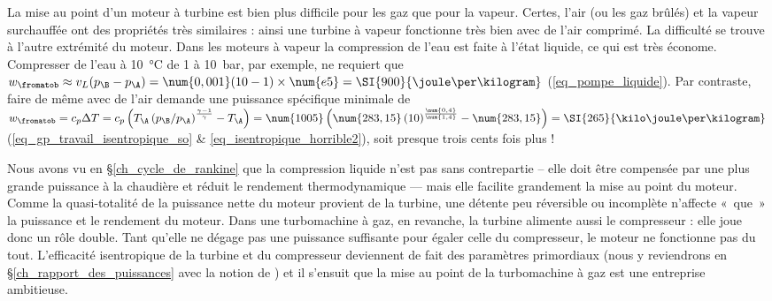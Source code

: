 La mise au point d’un moteur à turbine est bien plus difficile pour les gaz que pour la vapeur. Certes, l’air (ou les gaz brûlés) et la vapeur surchauffée ont des propriétés très similaires : ainsi une turbine à vapeur fonctionne très bien avec de l’air comprimé. La difficulté se trouve à l’autre extrémité du moteur. Dans les moteurs à vapeur la compression de l’eau est faite à l’état liquide, ce qui est très économe. Compresser de l’eau à \SI{10}{\degreeCelsius} de \num{1} à \SI{10}{\bar}, par exemple, ne requiert que $w_\fromatob \approx v_L (p_\B - p_\A ) = \num{0,001} (10 - 1) \times \num{e5} = \SI{900}{\joule\per\kilogram}$ (\ref{eq_pompe_liquide}). Par contraste, faire de même avec de l’air demande une puissance spécifique minimale de $w_\fromatob = c_p \Delta T = c_p \left( T_\A \left(p_\B/p_\A\right)^\frac{\gamma - 1}{\gamma} - T_\A \right) = \num{1005} \left(\num{283,15} \left(10\right)^\frac{\num{0,4}}{\num{1,4}} - \num{283,15} \right) = \SI{265}{\kilo\joule\per\kilogram}$ (\ref{eq_gp_travail_isentropique_so} \& \ref{eq_isentropique_horrible2}), soit presque trois cents fois plus !

Nous avons vu en \S\ref{ch_cycle_de_rankine} que la compression liquide n’est pas sans contrepartie – elle doit être compensée par une plus grande puissance à la chaudière et réduit le rendement thermodynamique — mais elle facilite grandement la mise au point du moteur. Comme la quasi-totalité de la puissance nette du moteur provient de la turbine, une détente peu réversible ou incomplète n’affecte «~que~» la puissance et le rendement du moteur. Dans une turbomachine à gaz, en revanche, la turbine alimente aussi le compresseur : elle joue donc un rôle double. Tant qu’elle ne dégage pas une puissance suffisante pour égaler celle du compresseur, le moteur ne fonctionne pas du tout. L’efficacité isentropique de la turbine et du compresseur deviennent de fait des paramètres primordiaux (nous y reviendrons en \S\ref{ch_rapport_des_puissances} avec la notion de ) et il s’ensuit que la mise au point de la turbomachine à gaz est une entreprise ambitieuse.

